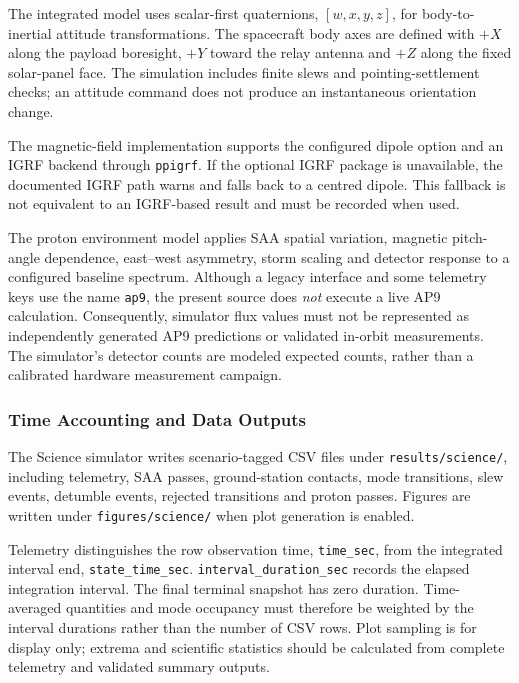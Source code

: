 The integrated model uses scalar-first quaternions, $[w,x,y,z]$, for body-to-inertial attitude transformations. The spacecraft body axes are defined with $+X$ along the payload boresight, $+Y$ toward the relay antenna and $+Z$ along the fixed solar-panel face. The simulation includes finite slews and pointing-settlement checks; an attitude command does not produce an instantaneous orientation change.

The magnetic-field implementation supports the configured dipole option and an IGRF backend through \texttt{ppigrf}. If the optional IGRF package is unavailable, the documented IGRF path warns and falls back to a centred dipole. This fallback is not equivalent to an IGRF-based result and must be recorded when used.

The proton environment model applies SAA spatial variation, magnetic pitch-angle dependence, east--west asymmetry, storm scaling and detector response to a configured baseline spectrum. Although a legacy interface and some telemetry keys use the name \texttt{ap9}, the present source does \emph{not} execute a live AP9 calculation. Consequently, simulator flux values must not be represented as independently generated AP9 predictions or validated in-orbit measurements. The simulator's detector counts are modeled expected counts, rather than a calibrated hardware measurement campaign.

\subsubsection{Time Accounting and Data Outputs}
\label{app:data-reproduction}
The Science simulator writes scenario-tagged CSV files under \texttt{results/science/}, including telemetry, SAA passes, ground-station contacts, mode transitions, slew events, detumble events, rejected transitions and proton passes. Figures are written under \texttt{figures/science/} when plot generation is enabled.

Telemetry distinguishes the row observation time, \texttt{time\_sec}, from the integrated interval end, \texttt{state\_time\_sec}. \texttt{interval\_duration\_sec} records the elapsed integration interval. The final terminal snapshot has zero duration. Time-averaged quantities and mode occupancy must therefore be weighted by the interval durations rather than the number of CSV rows. Plot sampling is for display only; extrema and scientific statistics should be calculated from complete telemetry and validated summary outputs.

